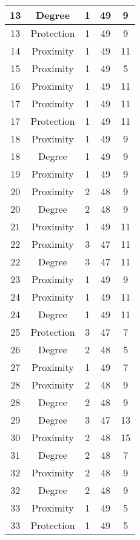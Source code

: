 \documentclass[results.tex]{subfiles}
\begin{document}
\begin{center}
\begin{tabular}{| c || c | c | c | c |}
    \hline
    13 & Degree & 1 & 49 & 9 \\ 
    \hline
    13 & Protection & 1 & 49 & 9 \\ 
    \hline
    14 & Proximity & 1 & 49 & 11 \\ 
    \hline
    15 & Proximity & 1 & 49 & 5 \\ 
    \hline
    16 & Proximity & 1 & 49 & 11 \\ 
    \hline
    17 & Proximity & 1 & 49 & 11 \\ 
    \hline
    17 & Protection & 1 & 49 & 11 \\ 
    \hline
    18 & Proximity & 1 & 49 & 9 \\ 
    \hline
    18 & Degree & 1 & 49 & 9 \\ 
    \hline
    19 & Proximity & 1 & 49 & 9 \\ 
    \hline
    20 & Proximity & 2 & 48 & 9 \\ 
    \hline
    20 & Degree & 2 & 48 & 9 \\ 
    \hline
    21 & Proximity & 1 & 49 & 11 \\ 
    \hline
    22 & Proximity & 3 & 47 & 11 \\ 
    \hline
    22 & Degree & 3 & 47 & 11 \\ 
    \hline
    23 & Proximity & 1 & 49 & 9 \\ 
    \hline
    24 & Proximity & 1 & 49 & 11 \\ 
    \hline
    24 & Degree & 1 & 49 & 11 \\ 
    \hline
    25 & Protection & 3 & 47 & 7 \\ 
    \hline
    26 & Degree & 2 & 48 & 5 \\ 
    \hline
    27 & Proximity & 1 & 49 & 7 \\ 
    \hline
    28 & Proximity & 2 & 48 & 9 \\ 
    \hline
    28 & Degree & 2 & 48 & 9 \\ 
    \hline
    29 & Degree & 3 & 47 & 13 \\ 
    \hline
    30 & Proximity & 2 & 48 & 15 \\ 
    \hline
    31 & Degree & 2 & 48 & 7 \\ 
    \hline
    32 & Proximity & 2 & 48 & 9 \\ 
    \hline
    32 & Degree & 2 & 48 & 9 \\ 
    \hline
    33 & Proximity & 1 & 49 & 5 \\ 
    \hline
    33 & Protection & 1 & 49 & 5 \\ 
    \hline

\end{tabular}
\end{center}
\end{document}
